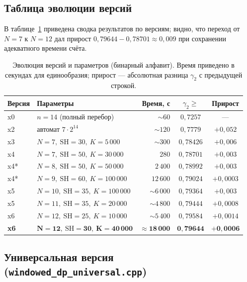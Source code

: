 \subsection{Таблица эволюции версий}

В таблице~\ref{tab:versions} приведена сводка результатов по версиям; видно, что переход от $N = 7$ к $N = 12$ дал прирост $0{,}79644 - 0{,}78701 \approx 0{,}009$ при сохранении адекватного времени счёта.

\begin{table}[h!]
\caption{Эволюция версий и параметров (бинарный алфавит). Время приведено в секундах для единообразия; прирост --- абсолютная разница $\gamma_2$ с предыдущей строкой.}
\label{tab:versions}
\centering
\small
\begin{tabular}{|l|l|r|c|c|}
\hline
Версия & Параметры                          & Время, с    & $\gamma_2 \geq$ & Прирост \\
\hline
x0  & $n = 14$ (полный перебор)            & $\sim 60$         & $0{,}7257$  & ---       \\
x2  & автомат $7 \cdot 2^{14}$             & $\sim 120$        & $0{,}7779$  & $+0{,}052$ \\
x3  & $N=7,\ \mathrm{SH}=30,\ K=5\,000$    & $\sim 300$        & $0{,}78426$ & $+0{,}006$ \\
x4  & $N=7,\ \mathrm{SH}=50,\ K=30\,000$   & $280$             & $0{,}78701$ & $+0{,}003$ \\
x4* & $N=8,\ \mathrm{SH}=50,\ K=50\,000$   & $2\,400$          & $0{,}78992$ & $+0{,}003$ \\
x4* & $N=9,\ \mathrm{SH}=60,\ K=100\,000$  & $12\,600$         & $0{,}79024$ & $+0{,}0003$ \\
x5  & $N=10,\ \mathrm{SH}=35,\ K=100\,000$ & $\sim 6\,000$     & $0{,}79364$ & $+0{,}003$ \\
x5  & $N=11,\ \mathrm{SH}=35,\ K=20\,000$  & $\sim 4\,800$     & $0{,}79444$ & $+0{,}0008$ \\
x6  & $N=12,\ \mathrm{SH}=25,\ K=10\,000$  & $\sim 5\,400$     & $0{,}79584$ & $+0{,}0014$ \\
\textbf{x6} & $\boldsymbol{N=12,\ \mathrm{SH}=30,\ K=40\,000}$ & $\boldsymbol{\approx 18\,000}$ & $\boldsymbol{0{,}79644}$ & $\boldsymbol{+0{,}0006}$ \\
\hline
\end{tabular}
\end{table}

\subsection{Универсальная версия (\texttt{windowed\_dp\_universal.cpp})}

